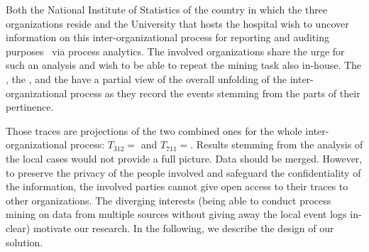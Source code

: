 Both the National Institute of Statistics of the country in which the three organizations reside and the University that hosts the hospital wish to uncover information on this inter-organizational process for reporting and auditing purposes~\citep{Jans.Hosseinpour/IJAIS2019:ActiveLearningProcessMiningForAuditing} via process analytics. The involved organizations share the urge for such an analysis and wish to be able to repeat the mining task also in-house. 
The , the , and the  have a partial view of the overall unfolding of the inter-organizational process as they record the events stemming from the parts of their pertinence. %

Those traces are projections of the two combined ones for the whole inter-organizational process: $T_{312}=$\textlangle{}{\TaliceUncolored}\textrangle{} and $T_{711}=$\textlangle{}{\TbobUncolored}\textrangle{}. %
Results stemming from the analysis of the local cases would not provide a full picture. Data should be merged. However, to preserve the privacy of the people involved and safeguard the confidentiality of the information, the involved parties cannot give open access to their traces to other organizations. The diverging interests (being able to conduct process mining on data from multiple sources without giving away the local event logs in-clear) motivate our research. In the following, we describe the design of our solution.

